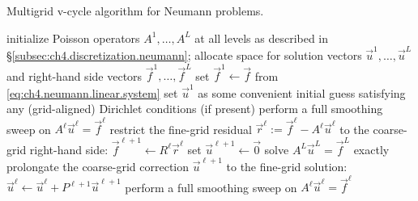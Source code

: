 \begin{algorithm}[htbp]
\caption{Multigrid v-cycle algorithm for Neumann problems.}
\label{alg:ch4.multigrid.neumann.vcycle}
\begin{algorithmic}[1]
\STATE initialize Poisson operators $A^1, \dotsc, A^L$ at all levels as described in \S\ref{subsec:ch4.discretization.neumann}; allocate space for solution vectors $\vec{u}^1, \dotsc, \vec{u}^L$ and right-hand side vectors $\vec{f}^1, \dotsc, \vec{f}^L$
\STATE set $\vec{f}^1 \leftarrow \vec{f}$ from \eqref{eq:ch4.neumann.linear.system}
\STATE set $\vec{u}^1$ as some convenient initial guess satisfying any (grid-aligned) Dirichlet conditions (if present)
    \STATE perform a full smoothing sweep on $A^{\ell} \vec{u}^{\ell} = \vec{f}^{\ell}$ 
    \STATE restrict the fine-grid residual $\vec{r}^{\ell} := \vec{f}^{\ell} - A^{\ell} \vec{u}^{\ell}$ to the coarse-grid right-hand side: $\vec{f}^{\ell+1} \leftarrow R^{\ell} \vec{r}^{\ell}$ 
    \STATE set $\vec{u}^{\ell+1} \leftarrow \vec{0}$
\ENDFOR
\STATE solve $A^L \vec{u}^L = \vec{f}^L$ exactly 
    \STATE prolongate the coarse-grid correction $\vec{u}^{\ell+1}$ to the fine-grid solution: $\vec{u}^{\ell} \leftarrow \vec{u}^{\ell} + P^{\ell+1} \vec{u}^{\ell+1}$ 
    \STATE perform a full smoothing sweep on $A^{\ell} \vec{u}^{\ell} = \vec{f}^{\ell}$ 
\ENDFOR
\end{algorithmic}
\end{algorithm}

